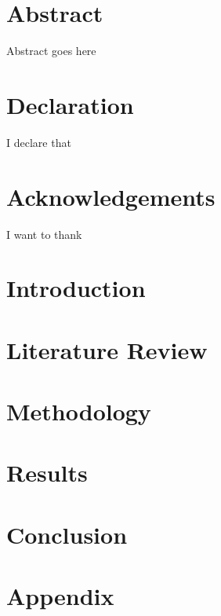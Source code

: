 \documentclass[12pt,twoside]{report}
\begin{document}


\chapter*{Abstract}
Abstract goes here

\chapter*{Declaration}
I declare that

\chapter*{Acknowledgements}
I want to thank

\tableofcontents

\listoffigures

\listoftables

\chapter{Introduction}


\chapter{Literature Review}


\chapter{Methodology}


\chapter{Results}


\chapter{Conclusion}


\appendix
\chapter{Appendix}


\printbibliography{}
\end{document}
